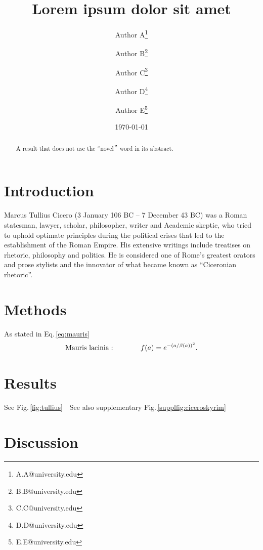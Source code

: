 \documentclass[fleqn]{scrartcl}%
\title{Lorem ipsum dolor sit amet}%
\author[1]{Author A\thanks{A.A@university.edu}}
\author[1]{Author B\thanks{B.B@university.edu}}
\author[1]{Author C\thanks{C.C@university.edu}}
\author[2]{Author D\thanks{D.D@university.edu}}
\author[2]{Author E\thanks{E.E@university.edu}}
\affil[1]{Department of Computer Science, \LaTeX\ University}
\affil[2]{Department of Mechanical Engineering, \LaTeX\ University}
\date{\today}%
\begin{document}
    \maketitle
    \begin{abstract}
        A result that does not use the ``novel\("\) word in its abstract.
    \end{abstract}


    \clearpage
    \section*{Introduction}
    Marcus Tullius Cicero (3 January 106 BC – 7 December 43 BC) was a Roman statesman, lawyer, scholar, philosopher,
    writer and Academic skeptic, who tried to uphold optimate principles during the political crises that led to the
    establishment of the Roman Empire.\cite{cicero2001cicero}
    His extensive writings include treatises on rhetoric, philosophy and politics.
    He is considered one of Rome's greatest orators and prose stylists
    and the innovator of what became known as ``Ciceronian rhetoric''.

    \clearpage
    \section*{Methods}
    As stated in Eq.\,\ref{eq:mauris}
    \newline
    \blindtext
    \begin{align}\label{eq:mauris}
        \textnormal{Mauris lacinia}: \hspace{0.5in}	 f(a) = e^{-(a/\beta(a))^2}.
    \end{align}



    \clearpage
    \section*{Results}
    See Fig.\,\ref{fig:tullius}
    \newline
    \blindtext\,\
    See also supplementary Fig.\,\ref{supplfig:ciceroskyrim}


    \clearpage
    \section*{Discussion}
    \blindtext
\end{document}
